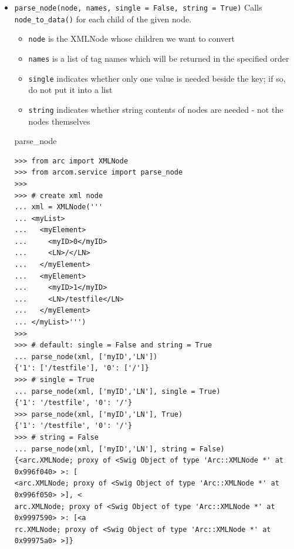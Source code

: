 \documentclass{article}
\begin{document}
\begin{flushleft}
\begin{itemize}
  \item{ \verb$parse_node(node, names, single = False, string = True)$ \linebreak
  Calls \verb$node_to_data()$ for each child of the given node.
  \begin{itemize}
    \item{\verb$node$ is the XMLNode whose children we want to convert}
    \item{\verb$names$ is a list of tag names which will be returned in the specified order}
    \item{\verb$single$ indicates whether only one value is needed beside the key; if so, do not put it into a list}
    \item{\verb$string$ indicates whether string contents of nodes are needed - not the nodes themselves}
  \end{itemize}
    \begin{example}
      \caption{parse\_node}\label{pnex}
\begin{verbatim}
>>> from arc import XMLNode
>>> from arcom.service import parse_node
>>> 
>>> # create xml node
... xml = XMLNode('''
... <myList>
...   <myElement>
...     <myID>0</myID>
...     <LN>/</LN>
...   </myElement>
...   <myElement>
...     <myID>1</myID>
...     <LN>/testfile</LN>
...   </myElement>
... </myList>''')
>>> 
>>> # default: single = False and string = True
... parse_node(xml, ['myID','LN'])
{'1': ['/testfile'], '0': ['/']}
>>> # single = True
... parse_node(xml, ['myID','LN'], single = True)
{'1': '/testfile', '0': '/'}
>>> parse_node(xml, ['myID','LN'], True)
{'1': '/testfile', '0': '/'}
>>> # string = False
... parse_node(xml, ['myID','LN'], string = False)
{<arc.XMLNode; proxy of <Swig Object of type 'Arc::XMLNode *' at 0x996f040> >: [
<arc.XMLNode; proxy of <Swig Object of type 'Arc::XMLNode *' at 0x996f050> >], <
arc.XMLNode; proxy of <Swig Object of type 'Arc::XMLNode *' at 0x9997590> >: [<a
rc.XMLNode; proxy of <Swig Object of type 'Arc::XMLNode *' at 0x99975a0> >]}
\end{verbatim}
    \end{example}
  }
\end{itemize}


\end{flushleft}
\end{document}
